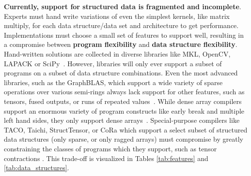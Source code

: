 %
\textbf{Currently, support for structured data is fragmented and incomplete}.
%
Experts must hand write variations of even the simplest kernels, like matrix
multiply, for each data structure/data set and architecture to get performance.
%
Implementations must choose a small set of features to support well, resulting
in a compromise between \textbf{program flexibility} and \textbf{data structure
flexibility}.
%
Hand-written solutions are collected in diverse libraries like
MKL, OpenCV, LAPACK or SciPy~\cite{ bradski2000opencv, anderson1999lapack, virtanen2020scipy, psarras2022linear}. 
%
However, libraries will only ever support a subset of
programs on a subset of data structure combinations.
%
Even the most advanced
libraries, such as the GraphBLAS, which support a wide variety of sparse
operations over various semi-rings always lack support for other features, such
as tensors, fused outputs, or runs of repeated values~\cite{bulucc2017design, mattson2019lagraph}.
%
While dense array
compilers support an enormous variety of program constructs like early break and
multiple left hand sides, they only support dense arrays~\cite{ragan-kelley_halide_2013,grosser2012polly}.  
%
Special-purpose
compilers like TACO, Taichi, StructTensor, or CoRa which support a select subset of structured data
structures (only sparse, or only ragged arrays) must compromise by greatly
constraining the classes of programs which they support, such as tensor
contractions \cite{kjolstad_tensor_2019, hu_taichi_2019, ghorbani2023compiling, fegade_cora_2022}. 
%
This trade-off is visualized in Tables \ref{tab:features} and \ref{tab:data_structures}.
%


